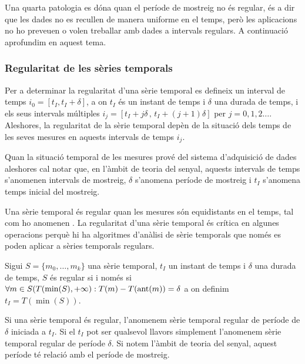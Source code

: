 Una quarta patologia es dóna quan el període de mostreig no és
regular, és a dir que les dades no es recullen de manera uniforme en
el temps, però les aplicacions no ho preveuen o volen treballar amb
dades a intervals regulars. A continuació aprofundim en aquest tema.






\subsubsection{Regularitat de les sèries temporals} 


Per a determinar la regularitat d'una sèrie temporal es defineix un
interval de temps $i_0=[t_I,t_I+\delta]$, a on $t_I$ és un instant de
temps i $\delta$ una durada de temps, i els seus intervals múltiples
$i_j=[t_I+j\delta\, ,\, t_I+(j+1)\delta]$ per
$j=0,1,2\ldots$. Aleshores, la regularitat de la sèrie temporal depèn
de la situació dels temps de les seves mesures en aquests intervals de
temps $i_j$.
 
Quan la situació temporal de les mesures prové del sistema
d'adquisició de dades aleshores cal notar que, en l'àmbit de
teoria del senyal, aquests intervals de temps s'anomenen intervals de
mostreig, $\delta$ s'anomena període de mostreig i $t_I$ s'anomena
temps inicial del mostreig.


Una sèrie temporal és regular quan les mesures són equidistants en el
temps, tal com ho anomenen \textcite{last:hetland}.  La regularitat
d'una sèrie temporal és crítica en algunes operacions perquè hi ha
algoritmes d'anàlisi de sèrie temporals que només es poden aplicar a
sèries temporals regulars.
\begin{definition}
  \label{def:st:regular}
  Sigui $S=\{m_0,\ldots,m_k\}$ una sèrie temporal, $t_I$ un instant de
  temps i $\delta$ una durada de temps, $S$ és regular si i
  només si $\forall m \in S(T(\min(S),+\infty):T(m) - T(\operatorname*{ant}(m)) =
  \delta$ a on definim $t_I=T(\min(S))$.
\end{definition}

Si una sèrie temporal és regular, l'anomenem sèrie temporal regular de
període de $\delta$ iniciada a $t_I$. Si el $t_I$ pot ser qualsevol
llavors simplement l'anomenem sèrie temporal regular de període
$\delta$.  Si notem l'àmbit de teoria del senyal, aquest període té
relació amb el període de mostreig.


